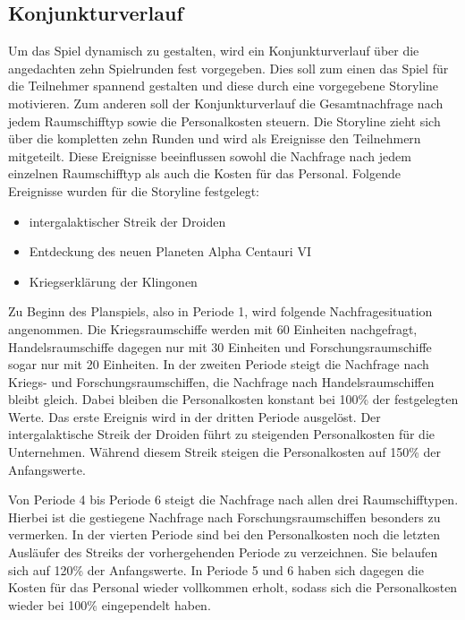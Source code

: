 \subsection{Konjunkturverlauf}
\label{sec:spielwelt-szenario-konjunkturverlauf}


Um das Spiel dynamisch zu gestalten, wird ein Konjunkturverlauf über die angedachten zehn Spielrunden fest vorgegeben. Dies soll zum einen das Spiel für die Teilnehmer spannend gestalten und diese durch eine vorgegebene Storyline motivieren. Zum anderen soll der Konjunkturverlauf die Gesamtnachfrage nach jedem Raumschifftyp sowie die Personalkosten steuern. Die Storyline zieht sich über die kompletten zehn Runden und wird als Ereignisse den Teilnehmern mitgeteilt. Diese Ereignisse beeinflussen sowohl die Nachfrage nach jedem einzelnen Raumschifftyp als auch die Kosten für das Personal. Folgende Ereignisse wurden für die Storyline festgelegt:

\begin{itemize}
\item intergalaktischer Streik der Droiden
\item Entdeckung des neuen Planeten Alpha Centauri VI
\item Kriegserklärung der Klingonen
\end{itemize}

Zu Beginn des Planspiels, also in Periode 1, wird folgende Nachfragesituation angenommen. Die Kriegsraumschiffe werden mit 60 Einheiten nachgefragt, Handelsraumschiffe dagegen nur mit 30 Einheiten und Forschungsraumschiffe sogar nur mit 20 Einheiten. In der zweiten Periode steigt die Nachfrage nach Kriegs- und Forschungsraumschiffen, die Nachfrage nach Handelsraumschiffen bleibt gleich. Dabei bleiben die Personalkosten konstant bei 100\% der festgelegten Werte. Das erste Ereignis wird in der dritten Periode ausgelöst. Der intergalaktische Streik der Droiden führt zu steigenden Personalkosten für die Unternehmen. Während diesem Streik steigen die Personalkosten auf 150\% der Anfangswerte.
 
Von Periode 4 bis Periode 6 steigt die Nachfrage nach allen drei Raumschifftypen. Hierbei ist die gestiegene Nachfrage nach Forschungsraumschiffen besonders zu vermerken. In der vierten Periode sind bei den Personalkosten noch die letzten Ausläufer des Streiks der vorhergehenden Periode zu verzeichnen. Sie belaufen sich auf 120\% der Anfangswerte. In Periode 5 und 6 haben sich dagegen die Kosten für das Personal wieder vollkommen erholt, sodass sich die Personalkosten wieder bei 100\% eingependelt haben.

